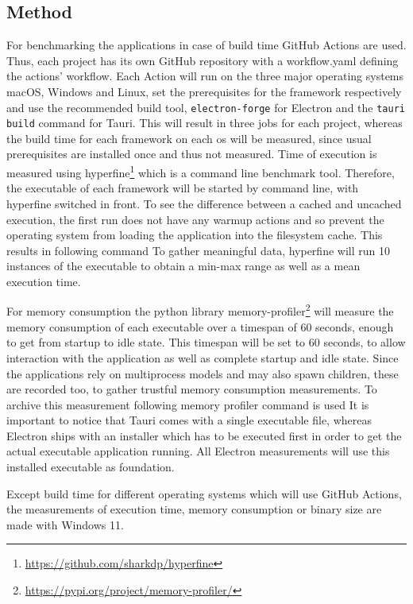 \subsection{Method}
\label{subsec:method}
For benchmarking the applications in case of build time GitHub Actions are used.
Thus, each project has its own GitHub repository with a workflow.yaml defining the actions' workflow.
Each Action will run on the three major operating systems macOS, Windows and Linux, set the prerequisites for the framework respectively and use the recommended build tool, \texttt{electron-forge} for Electron and the \texttt{tauri build} command for Tauri.
This will result in three jobs for each project, whereas the build time for each framework on each os will be measured, since usual prerequisites are installed once and thus not measured.
Time of execution is measured using hyperfine\footnote{\url{https://github.com/sharkdp/hyperfine}} which is a command line benchmark tool.
Therefore, the executable of each framework will be started by command line, with hyperfine switched in front.
To see the difference between a cached and uncached execution, the first run does not have any warmup actions and so prevent the operating system from loading the application into the filesystem cache.
This results in following command 
To gather meaningful data, hyperfine will run 10 instances of the executable to obtain a min-max range as well as a mean execution time.

For memory consumption the python library memory-profiler\footnote{\url{https://pypi.org/project/memory-profiler/}} will measure the memory consumption of each executable over a timespan of 60 seconds,
enough to get from startup to idle state.
This timespan will be set to 60 seconds, to allow interaction with the application as well as complete startup and idle state.
Since the applications rely on multiprocess models and may also spawn children, these are recorded too, to gather trustful memory consumption measurements.
To archive this measurement following memory profiler command is used 
It is important to notice that Tauri comes with a single executable file, whereas Electron ships with an installer which has to be executed first in order to get the actual executable application running.
All Electron measurements will use this installed executable as foundation.

Except build time for different operating systems which will use GitHub Actions, the measurements of execution time, memory consumption or binary size
are made with Windows 11.

